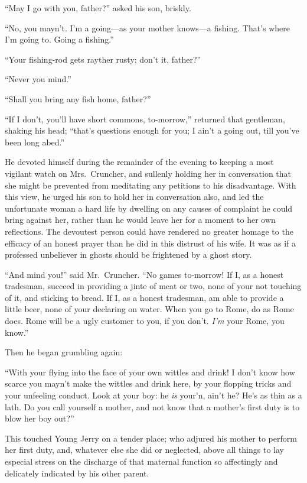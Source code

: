 ``May I go with you, father?'' asked his son, briskly.

``No, you mayn't.  I'm a going---as your mother knows---a fishing.
That's where I'm going to.  Going a fishing.''

``Your fishing-rod gets rayther rusty; don't it, father?''

``Never you mind.''

``Shall you bring any fish home, father?''

``If I don't, you'll have short commons, to-morrow,'' returned that
gentleman, shaking his head; ``that's questions enough for you; I
ain't a going out, till you've been long abed.''

He devoted himself during the remainder of the evening to keeping
a most vigilant watch on Mrs.\ Cruncher, and sullenly holding her in
conversation that she might be prevented from meditating any petitions
to his disadvantage.  With this view, he urged his son to hold her in
conversation also, and led the unfortunate woman a hard life by dwelling
on any causes of complaint he could bring against her, rather than he
would leave her for a moment to her own reflections.  The devoutest
person could have rendered no greater homage to the efficacy of an honest
prayer than he did in this distrust of his wife.  It was as if a
professed unbeliever in ghosts should be frightened by a ghost story.

``And mind you!'' said Mr.\ Cruncher.  ``No games to-morrow!  If I,
as a honest tradesman, succeed in providing a jinte of meat or two,
none of your not touching of it, and sticking to bread.  If I,
as a honest tradesman, am able to provide a little beer, none of your
declaring on water.  When you go to Rome, do as Rome does.  Rome will
be a ugly customer to you, if you don't.  \emph{I'm} your Rome, you know.''

Then he began grumbling again:

``With your flying into the face of your own wittles and drink!  I don't
know how scarce you mayn't make the wittles and drink here, by your
flopping tricks and your unfeeling conduct.  Look at your boy:  he \emph{is}
your'n, ain't he?  He's as thin as a lath.  Do you call yourself a
mother, and not know that a mother's first duty is to blow her boy out?''

This touched Young Jerry on a tender place; who adjured his mother to
perform her first duty, and, whatever else she did or neglected, above
all things to lay especial stress on the discharge of that maternal
function so affectingly and delicately indicated by his other parent.

